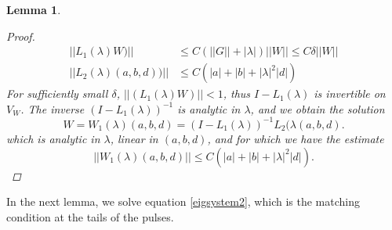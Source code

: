 \documentclass[12pt]{elsarticle}
\newtheorem{lemma}{Lemma}
\begin{document}
\begin{lemma}
\begin{proof}
\begin{align*}
||L_1(\lambda)W)|| &\leq C \left(||G|| + |\lambda| \right)||W|| \leq C \delta ||W|| \\
||L_2(\lambda)(a,b,d))|| &\leq C\left( |a| + |b| + |\lambda|^2 |d| \right)
\end{align*}
For sufficiently small $\delta$, $||(L_1(\lambda)W)|| < 1$, thus $I - L_1(\lambda)$ is invertible on $V_W$. The inverse $(I - L_1(\lambda))^{-1}$ is analytic in $\lambda$, and we obtain the solution 
\[
W = W_1(\lambda)(a,b,d) = (I - L_1(\lambda))^{-1} L_2(\lambda(a,b,d).
\]
which is analytic in $\lambda$, linear in $(a, b, d)$, and for which we have the estimate
\begin{equation*}
||W_1(\lambda)(a,b,d)|| \leq C \left( |a| + |b| + |\lambda|^2 |d| \right).
\end{equation*}
\end{proof}
\end{lemma}

In the next lemma, we solve equation \eqref{eigsystem2}, which is the matching condition at the tails of the pulses.
\end{document}
